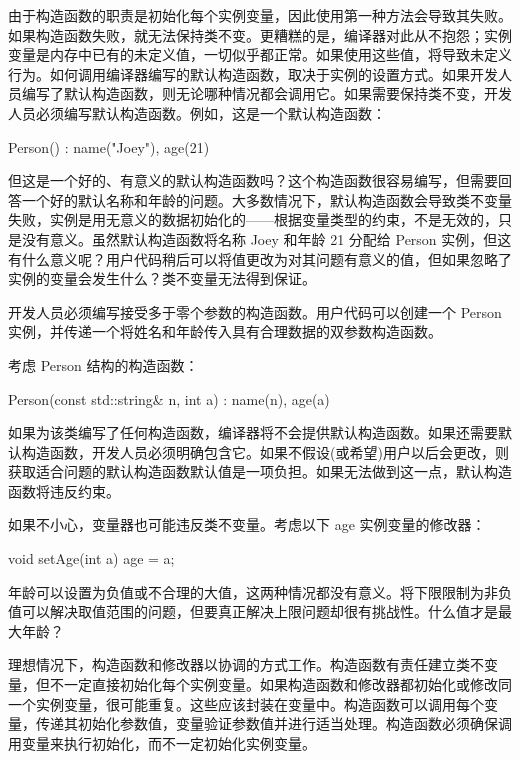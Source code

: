 
由于构造函数的职责是初始化每个实例变量，因此使用第一种方法会导致其失败。如果构造函数失败，就无法保持类不变。更糟糕的是，编译器对此从不抱怨；实例变量是内存中已有的未定义值，一切似乎都正常。如果使用这些值，将导致未定义行为。如何调用编译器编写的默认构造函数，取决于实例的设置方式。如果开发人员编写了默认构造函数，则无论哪种情况都会调用它。如果需要保持类不变，开发人员必须编写默认构造函数。例如，这是一个默认构造函数：

\begin{cpp}
Person() : name("Joey"), age(21) {}
\end{cpp}

但这是一个好的、有意义的默认构造函数吗？这个构造函数很容易编写，但需要回答一个好的默认名称和年龄的问题。大多数情况下，默认构造函数会导致类不变量失败，实例是用无意义的数据初始化的——根据变量类型的约束，不是无效的，只是没有意义。虽然默认构造函数将名称 Joey 和年龄 21 分配给 Person 实例，但这有什么意义呢？用户代码稍后可以将值更改为对其问题有意义的值，但如果忽略了实例的变量会发生什么？类不变量无法得到保证。

开发人员必须编写接受多于零个参数的构造函数。用户代码可以创建一个 Person 实例，并传递一个将姓名和年龄传入具有合理数据的双参数构造函数。

考虑 Person 结构的构造函数：

\begin{cpp}
Person(const std::string& n, int a) : name(n), age(a) {}
\end{cpp}

如果为该类编写了任何构造函数，编译器将不会提供默认构造函数。如果还需要默认构造函数，开发人员必须明确包含它。如果不假设(或希望)用户以后会更改，则获取适合问题的默认构造函数默认值是一项负担。如果无法做到这一点，默认构造函数将违反约束。

如果不小心，变量器也可能违反类不变量。考虑以下 age 实例变量的修改器：

\begin{cpp}
void setAge(int a) { age = a; }
\end{cpp}

年龄可以设置为负值或不合理的大值，这两种情况都没有意义。将下限限制为非负值可以解决取值范围的问题，但要真正解决上限问题却很有挑战性。什么值才是最大年龄？


理想情况下，构造函数和修改器以协调的方式工作。构造函数有责任建立类不变量，但不一定直接初始化每个实例变量。如果构造函数和修改器都初始化或修改同一个实例变量，很可能重复。这些应该封装在变量中。构造函数可以调用每个变量，传递其初始化参数值，变量验证参数值并进行适当处理。构造函数必须确保调用变量来执行初始化，而不一定初始化实例变量。

